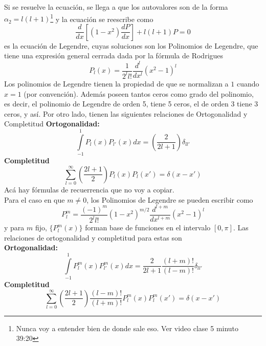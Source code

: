 \indent Si se resuelve la ecuación, se llega a que los autovalores son de la forma $\alpha_{2} = l(l+1)$\footnote{Nunca voy a entender bien de donde sale eso. Ver video clase 5 minuto 39:20} y la ecuación se reescribe como
\begin{equation*}
    \frac{d}{dx}
    \left[
        (1-x^{2})\frac{dP}{dx}
    \right]
    + l(l+1) P
    = 0
\end{equation*}
es la ecuación de Legendre, cuyas soluciones son los Polinomios de Legendre, que tiene una expresión general cerrada dada por la fórmula de Rodrigues
\begin{equation*}
    P_{l}(x) =
    \frac{1}{2^{l}l!}
    \frac{d^{l}}{dx^{l}}
    \left(
        x^{2} - 1
    \right)^{l}
\end{equation*}
Los polinomios de Legendre tienen la propiedad de que se normalizan a $1$ cuando $x = 1$ (por convención). Además poseen tantos ceros como grado del polinomio, es decir, el polinomio de Legendre de orden 5, tiene 5 ceros, el de orden 3 tiene 3 ceros, y así. Por otro lado, tienen  las siguientes relaciones de Ortogonalidad y Completitud
\textbf{Ortogonalidad:}
\begin{equation*}
    \int\limits_{-1}^{1}
    P_{l}(x)P_{l'}(x)dx = \left(\frac{2}{2l +1}\right)\delta_{ll'}
\end{equation*}
\textbf{Completitud}
\begin{equation*}
    \sum\limits_{l = 0}^{\infty}
    \left(
        \frac{2l+1}{2}
    \right)P_{l}(x)P_{l}(x')
    =
    \delta(x-x')
\end{equation*}
Acá hay fórmulas de recuerrencia que no voy a copiar.\\
\indent Para el caso en que $m \neq 0$, los Polinomios de Legendre se pueden escribir como
\begin{equation*}
    P_{l}^{m} = \frac{(-1)^{m}}{2^{l}l!}(1-x^{2})^{m/2}
    \frac{d^{l+m}}{dx^{l+m}}
    \left( x^{2}-1\right)^{l}
\end{equation*}
y para $m$ fijo, $\{ P_{l}^{m}(x)\}$ forman base de funciones en el intervalo $[0, \pi]$. Las relaciones de ortogonalidad y completitud para estas son\\
\textbf{Ortogonalidad:}
\begin{equation*}
    \int\limits_{-1}^{1}
    P_{l}^{m}(x)P_{l'}^{m}(x)dx 
    =
    \frac{2}{2l +1}
    \frac{(l+m)!}{(l-m)!}
    \delta_{ll'}
\end{equation*}
\textbf{Completitud}
\begin{equation*}
    \sum\limits_{l = 0}^{\infty}
    \left(
        \frac{2l+1}{2}
    \right)
    \frac{(l-m)!}{(l+m)!
    }
    P_{l}^{m}(x)P_{l}^{m}(x')
    =
    \delta(x-x')
\end{equation*}
